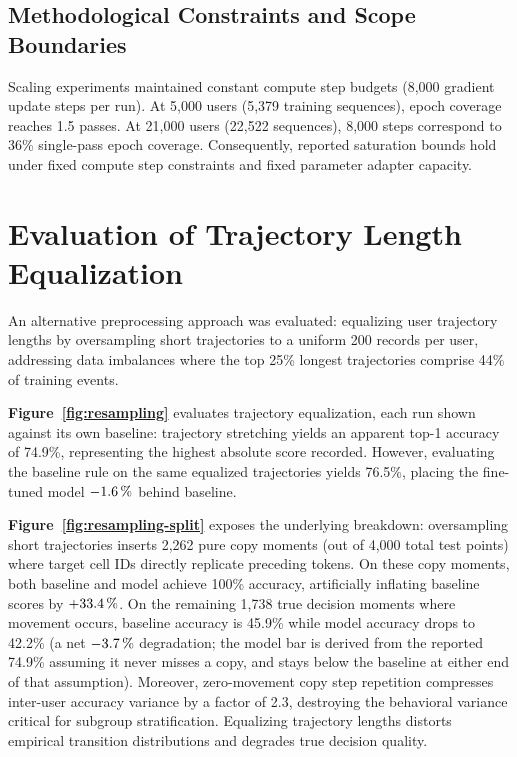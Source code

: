 \FloatBarrier

\subsection{Methodological Constraints and Scope Boundaries}
\label{sec:scale-limits}

Scaling experiments maintained constant compute step budgets (8,000 gradient update steps per run). At 5,000 users (5,379 training sequences), epoch coverage reaches 1.5 passes. At 21,000 users (22,522 sequences), 8,000 steps correspond to 36\% single-pass epoch coverage. Consequently, reported saturation bounds hold under fixed compute step constraints and fixed parameter adapter capacity.

\section{Evaluation of Trajectory Length Equalization}

An alternative preprocessing approach was evaluated: equalizing user trajectory lengths by oversampling short trajectories to a uniform 200 records per user, addressing data imbalances where the top 25\% longest trajectories comprise 44\% of training events.

\textbf{Figure~\ref{fig:resampling}} evaluates trajectory equalization, each run shown against its own baseline: trajectory stretching yields an apparent top-1 accuracy of 74.9\%, representing the highest absolute score recorded. However, evaluating the baseline rule on the same equalized trajectories yields 76.5\%, placing the fine-tuned model $-1.6\,\%$ behind baseline.



\textbf{Figure~\ref{fig:resampling-split}} exposes the underlying breakdown: oversampling short trajectories inserts 2,262 pure copy moments (out of 4,000 total test points) where target cell IDs directly replicate preceding tokens. On these copy moments, both baseline and model achieve 100\% accuracy, artificially inflating baseline scores by $+33.4\,\%$. On the remaining 1,738 true decision moments where movement occurs, baseline accuracy is 45.9\% while model accuracy drops to 42.2\% (a net $-3.7\,\%$ degradation; the model bar is derived from the reported 74.9\% assuming it never misses a copy, and stays below the baseline at either end of that assumption). Moreover, zero-movement copy step repetition compresses inter-user accuracy variance by a factor of 2.3, destroying the behavioral variance critical for subgroup stratification. Equalizing trajectory lengths distorts empirical transition distributions and degrades true decision quality.

